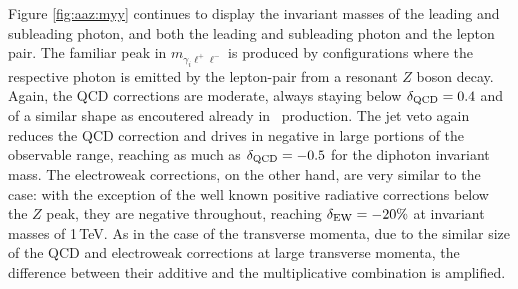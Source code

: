 Figure \ref{fig:aaz:myy} continues to display the invariant masses 
of the leading and subleading photon, and both the leading and 
subleading photon and the lepton pair. 
The familiar peak in $m_{\gamma_i\ell^+\ell^-}$ is produced by 
configurations where the respective photon is emitted by the 
lepton-pair from a resonant $Z$ boson decay. 
Again, the QCD corrections are moderate, always staying below 
$\delta_\text{QCD}=0.4$ and of a similar shape as encoutered already in 
\aaw\ production. 
The jet veto again reduces the QCD correction and drives in negative 
in large portions of the observable range, reaching as much as 
$\delta_\text{QCD}=-0.5$ for the diphoton invariant mass. 
The electroweak corrections, on the other hand, are very similar 
to the \aaw case: with the exception of the well known positive 
radiative corrections below the $Z$ peak, they are negative 
throughout, reaching $\delta_\text{EW}=-20\%$ at invariant masses of 
1\,TeV.
As in the case of the transverse momenta, due to the similar size 
of the QCD and electroweak corrections at large transverse 
momenta, the difference between their additive and the multiplicative 
combination is amplified.

